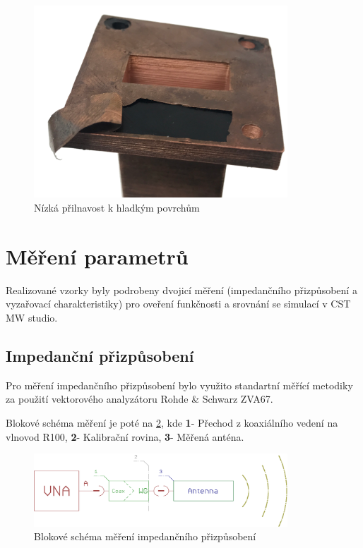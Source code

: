 \begin{figure}[h]
\begin{center}
\includegraphics[width=9.5cm]{pics/plated/adhes}
\caption{Nízká přilnavost k hladkým povrchům}
\label{fig:PLadh}
\end{center}
\end{figure}


\section{Měření parametrů}
Realizované vzorky byly podrobeny dvojicí měření (impedančního přizpůsobení a vyzařovací charakteristiky) pro oveření funkčnosti a srovnání se simulací v CST MW studio.

\subsection{Impedanční přizpůsobení}
Pro měření impedančního přizpůsobení bylo využito standartní měřící metodiky za použití vektorového analyzátoru Rohde \& Schwarz ZVA67.

Blokové schéma měření je poté na \ref{fig:MatchDia}, kde \textbf{1}- Přechod z koaxiálního vedení na vlnovod R100, \textbf{2}- Kalibrační rovina, \textbf{3}- Měřená anténa.
\begin{figure}[h]
\begin{center}
\includegraphics[width=9.5cm]{pics/MatchDia}
\caption{Blokové schéma měření impedančního přizpůsobení}
\label{fig:MatchDia}
\end{center}
\end{figure}


